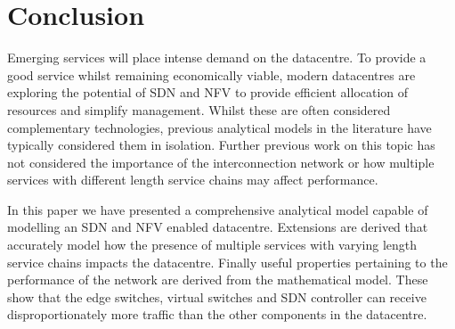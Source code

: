 
\section{Conclusion}
\label{sec:conclusions}
Emerging services will place intense demand on the datacentre. To provide a good service whilst remaining economically viable, modern datacentres are exploring the potential of SDN and NFV to provide efficient allocation of resources and simplify management. Whilst these are often considered complementary technologies, previous analytical models in the literature have typically considered them in isolation. Further previous work on this topic has not considered the importance of the interconnection network or how multiple services with different length service chains may affect performance.

In this paper we have presented a comprehensive analytical model capable of modelling an SDN and NFV enabled datacentre. Extensions are derived that accurately model how the presence of multiple services with varying length service chains impacts the datacentre. Finally useful properties pertaining to the performance of the network are derived from the mathematical model. These show that the edge switches, virtual switches and SDN controller can receive disproportionately more traffic than the other components in the datacentre.